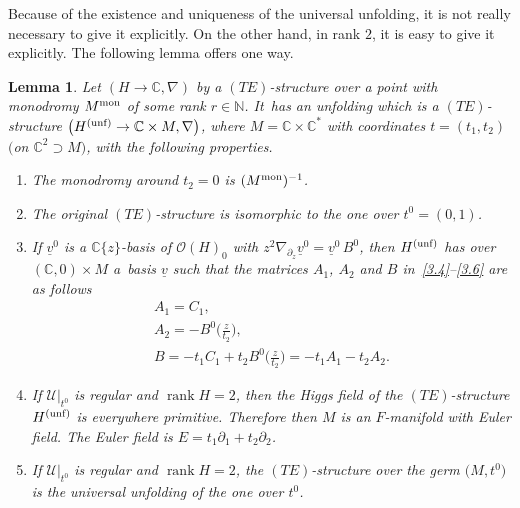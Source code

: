 \documentclass[pdftex]{sigma}%
\numberwithin{equation}{section}
\numberwithin{figure}{section}
\newcommand{\N}{{\mathbb N}}
\newcommand{\C}{{\mathbb C}}
\newcommand{\OO}{{\mathcal O}}
\newcommand{\UU}{{\mathcal U}}
\newcommand{\uuuu}{\underline}
\newcommand{\paa}{\partial}
\newcommand{\nnn}{\nabla}
\DeclareMathOperator{\rank}{rank}
\newtheorem{Lemma}[Theorem]{Lemma}
\begin{document}
Because of the existence and uniqueness of the universal
unfolding, it is not really necessary
to give it explicitly. On the other hand, in rank $2$,
it is easy to give it explicitly.
The following lemma offers one way.


\begin{Lemma}\label{t5.2}
Let $(H\to\C,\nnn)$ by a $(TE)$-structure over
a point with monodromy $M^{\rm mon}$ of some rank $r\in\N$. It~has an unfolding which is a $(TE)$-structure
$\big(H^{\rm (unf)}\to \C\times M,\nnn\big)$, where
$M=\C\times\C^*$ with coordinates $t=(t_1,t_2)$
$($on $\C^2\supset M)$, with the following properties.
\begin{enumerate}\itemsep=0pt
\item[$(a)$] The monodromy around $t_2=0$ is $(M^{\rm mon})^{-1}$.

\item[$(b)$] The original $(TE)$-structure is isomorphic to the
one over $t^0=(0,1)$.

\item[$(c)$] If $\uuuu{v}^0$ is a $\C\{z\}$-basis of $\OO(H)_0$
with $z^2\nnn_{\paa_z}\uuuu{v}^0=\uuuu{v}^0\, B^0$, then
$H^{\rm (unf)}$ has over $(\C,0)\times M$ a~basis
$\uuuu{v}$ such that the matrices $A_1$, $A_2$ and $B$
in~\eqref{3.4}--\eqref{3.6} are as follows
\begin{gather}
A_1= C_1,\label{5.2}
\\
A_2= -B^0\bigg(\frac{z}{t_2}\bigg),\label{5.3}
\\
B = -t_1C_1+t_2B^0\bigg(\frac{z}{t_2}\bigg)=-t_1A_1-t_2 A_2.\label{5.4}
\end{gather}

\item[$(d)$] If $\UU|_{t^0}$ is regular and $\rank H=2$, then
the Higgs field of the $(TE)$-structure $H^{\rm (unf)}$
is everywhere primitive. Therefore then $M$ is an $F$-manifold
with Euler field. The Euler field is $E=t_1\paa_1+t_2\paa_2$.

\item[$(e)$] If $\UU|_{t^0}$ is regular and $\rank H=2$,
the $(TE)$-structure over the germ $\big(M,t^0\big)$
is the universal unfolding of the one over $t^0$.
\end{enumerate}
\end{Lemma}
\end{document}
